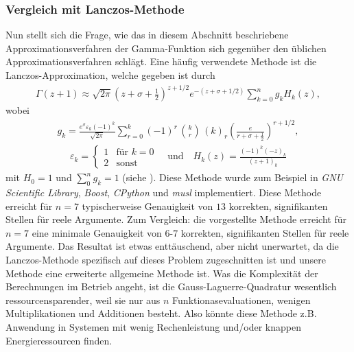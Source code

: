 \subsubsection{Vergleich mit Lanczos-Methode}
Nun stellt sich die Frage,
wie das in diesem Abschnitt beschriebene Approximationsverfahren
der Gamma-Funktion sich gegenüber den üblichen Approximationsverfahren schlägt.
Eine häufig verwendete Methode ist die Lanczos-Approximation,
welche gegeben ist durch
\begin{align}
\Gamma(z + 1)
\approx
\sqrt{2\pi} \left( z + \sigma + \frac{1}{2} \right)^{z + 1/2}
e^{-(z + \sigma + 1/2)} \sum_{k=0}^n g_k H_k(z)
,
\end{align}
wobei
\begin{align*}
g_k = \frac{e^\sigma \varepsilon_k (-1)^k}{\sqrt{2\pi}}
\sum_{r=0}^k (-1)^r \, \binom{k}{r} \, (k)_r
\left( \frac{e}{r + \sigma + \frac{1}{2}}\right)^{r + 1/2}
,
\end{align*}
\begin{align*}
\varepsilon_k
=
\begin{cases}
1 & \text{für } k = 0 \\
2 & \text{sonst}
\end{cases}
\quad \text{und}\quad
H_k(z)
=
\frac{(-1)^k (-z)_k}{(z+1)_k}
\end{align*}
mit $H_0 = 1$ und $\sum_0^n g_k = 1$ (siehe \cite{laguerre:lanczos}).
Diese Methode wurde zum Beispiel in 
{\em GNU Scientific Library}, {\em Boost}, {\em CPython} und 
{\em musl} implementiert.
Diese Methode erreicht für $n = 7$ typischerweise Genauigkeit von $13$
korrekten, signifikanten Stellen für reele Argumente.
Zum Vergleich: die vorgestellte Methode erreicht für $n = 7$ 
eine minimale Genauigkeit von $6$-$7$ korrekten, signifikanten Stellen 
für reele Argumente.
Das Resultat ist etwas enttäuschend,
aber nicht unerwartet,
da die Lanczos-Methode spezifisch auf dieses Problem zugeschnitten ist und 
unsere Methode eine erweiterte allgemeine Methode ist.
Was die Komplexität der Berechnungen im Betrieb angeht,
ist die Gauss-Laguerre-Quadratur wesentlich ressourcensparender,
weil sie nur aus $n$ Funktionasevaluationen, 
wenigen Multiplikationen und Additionen besteht.
Also könnte diese Methode z.B. Anwendung in Systemen mit wenig Rechenleistung
und/oder knappen Energieressourcen finden.